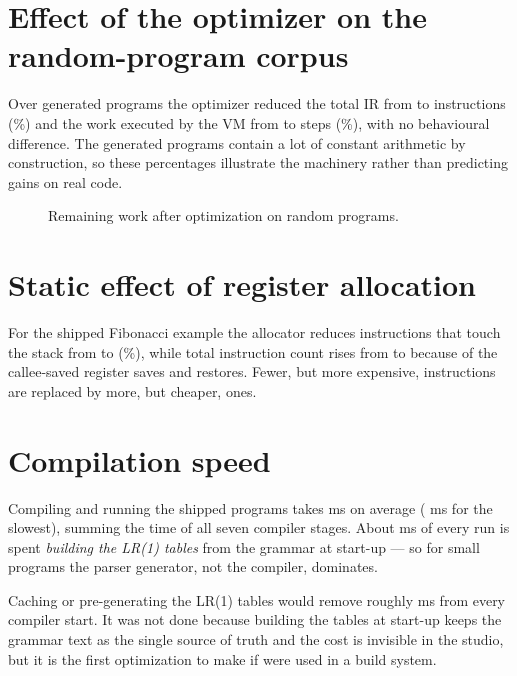 \section{Effect of the optimizer on the random-program corpus}
Over \FuzzN{} generated programs the optimizer reduced the total IR from \FuzzIRBefore{} to \FuzzIRAfter{} instructions (\FuzzIRCut{}\%) and the work executed by the VM from \FuzzStepsBefore{} to \FuzzStepsAfter{} steps (\FuzzStepCut{}\%), with no behavioural difference. The generated programs contain a lot of constant arithmetic by construction, so these percentages illustrate the machinery rather than predicting gains on real code.

\begin{figure}[H]\centering
{}
\caption{Remaining work after optimization on \FuzzN{} random programs.}
\end{figure}

\section{Static effect of register allocation}
For the shipped Fibonacci example the allocator reduces instructions that touch the stack from \AsmMemOff{} to \AsmMemOn{} (\AsmMemCut{}\%), while total instruction count rises from \AsmInstrOff{} to \AsmInstrOn{} because of the callee-saved register saves and restores. Fewer, but more expensive, instructions are replaced by more, but cheaper, ones.

\section{Compilation speed}
Compiling and running the \NumExamples{} shipped programs takes \CompileMsAvg{} ms on average (\CompileMsMax{} ms for the slowest), summing the time of all seven compiler stages. About \LRBuildMs{} ms of every run is spent \emph{building the LR(1) tables} from the grammar at start-up --- so for small programs the parser generator, not the compiler, dominates.

\begin{warnbox}
Caching or pre-generating the LR(1) tables would remove roughly \LRBuildMs{} ms from every compiler start. It was not done because building the tables at start-up keeps the grammar text as the single source of truth and the cost is invisible in the studio, but it is the first optimization to make if  were used in a build system.
\end{warnbox}
